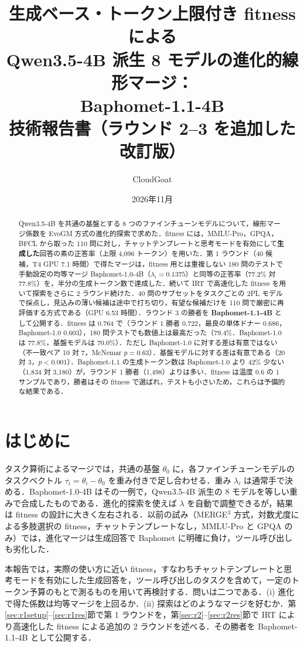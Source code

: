 \documentclass[uplatex,dvipdfmx,10pt,a4paper]{jsarticle}
\title{\mcfamily\bfseries 生成ベース・トークン上限付き fitness による\\Qwen3.5-4B 派生 8 モデルの進化的線形マージ：\\Baphomet-1.1-4B\\[2pt]\large 技術報告書（ラウンド 2--3 を追加した改訂版）}
\author{CloudGoat}
\date{2026年11月}
\begin{document}
\maketitle

\begin{abstract}
Qwen3.5-4B を共通の基盤とする 8 つのファインチューンモデルについて，線形マージ係数を EvoGM 方式の進化的探索で求めた．fitness には，MMLU-Pro，GPQA，BFCL から取った 110 問に対し，チャットテンプレートと思考モードを有効にして\textbf{生成した}回答の素の正答率（上限 4,096 トークン）を用いた．第 1 ラウンド（40 候補，T4 GPU 7.1 時間）で得たマージは，fitness 用とは重複しない 180 問のテストで手動設定の均等マージ Baphomet-1.0-4B（$\lambda_i=0.1375$）と同等の正答率（77.2\% 対 77.8\%）を，半分の生成トークン数で達成した．続いて IRT で高速化した fitness を用いて探索をさらに 2 ラウンド続けた．40 問のサブセットをタスクごとの 2PL モデルで採点し，見込みの薄い候補は途中で打ち切り，有望な候補だけを 110 問で厳密に再評価する方式である（GPU 6.53 時間）．ラウンド 3 の勝者を \textbf{Baphomet-1.1-4B} として公開する．fitness は 0.764 で（ラウンド 1 勝者 0.722，最良の単体ドナー 0.686，Baphomet-1.0 0.603），180 問テストでも数値上は最高だった（79.4\%．Baphomet-1.0 は 77.8\%，基盤モデルは 70.0\%）．ただし Baphomet-1.0 に対する差は有意ではない（不一致ペア 10 対 7，McNemar $p=0.63$）．基盤モデルに対する差は有意である（20 対 3，$p<0.001$）．Baphomet-1.1 の生成トークン数は Baphomet-1.0 より 42\% 少ない（1,834 対 3,180）が，ラウンド 1 勝者（1,498）よりは多い．fitness は温度 0.6 の 1 サンプルであり，勝者はその fitness で選ばれ，テストも小さいため，これらは予備的な結果である．
\end{abstract}

\section{はじめに}
タスク算術によるマージでは，共通の基盤 $\theta_0$ に，各ファインチューンモデルのタスクベクトル $\tau_i=\theta_i-\theta_0$ を重み付きで足し合わせる．重み $\lambda_i$ は通常手で決める．Baphomet-1.0-4B はその一例で，Qwen3.5-4B 派生の 8 モデルを等しい重みで合成したものである．進化的探索を使えば $\lambda$ を自動で調整できるが，結果は fitness の設計に大きく左右される．以前の試み（MERGE$^3$ 方式，対数尤度による多肢選択の fitness，チャットテンプレートなし，MMLU-Pro と GPQA のみ）では，進化マージは生成回答で Baphomet に明確に負け，ツール呼び出しも劣化した．

本報告では，実際の使い方に近い fitness，すなわちチャットテンプレートと思考モードを有効にした生成回答を，ツール呼び出しのタスクを含めて，一定のトークン予算のもとで測るものを用いて再検討する．問いは二つである．(i) 進化で得た係数は均等マージを上回るか．(ii) 探索はどのようなマージを好むか．第\ref{sec:r1setup}--\ref{sec:r1res}節で第 1 ラウンドを，第\ref{sec:r2}--\ref{sec:r2res}節で IRT により高速化した fitness による追加の 2 ラウンドを述べる．その勝者を Baphomet-1.1-4B として公開する．
\end{document}
